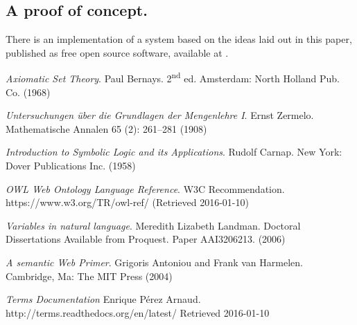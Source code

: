 \documentclass{IOS-Book-Article}     %
\begin{document}
\subsection{A proof of concept.}

There is an implementation of a system based on the ideas laid out in
this paper, published as free open source software, available at \cite{r7}.

\clearpage

\begin{thebibliography}{99}

\textit{Axiomatic Set Theory}. Paul Bernays.
    2\textsuperscript{nd} ed. Amsterdam: North Holland Pub. Co. (1968)

  \textit{Untersuchungen über die Grundlagen der Mengenlehre I}. Ernst Zermelo.
  Mathematische Annalen 65 (2): 261–281 (1908)

  \textit{Introduction to Symbolic Logic and its Applications}. Rudolf Carnap.
    New York: Dover Publications Inc. (1958)

  \textit{OWL Web Ontology Language Reference}. W3C Recommendation.
    https://www.w3.org/TR/owl-ref/ (Retrieved 2016-01-10)

  \textit{Variables in natural language}. Meredith Lizabeth Landman.
  Doctoral Dissertations Available from Proquest. Paper AAI3206213. (2006)

  \textit{A semantic Web Primer}. Grigoris Antoniou and Frank van Harmelen.
    Cambridge, Ma: The MIT Press (2004)

  \textit{Terms Documentation} Enrique P\'erez Arnaud.
  http://terms.readthedocs.org/en/latest/ Retrieved 2016-01-10


\end{thebibliography}
\end{document}
